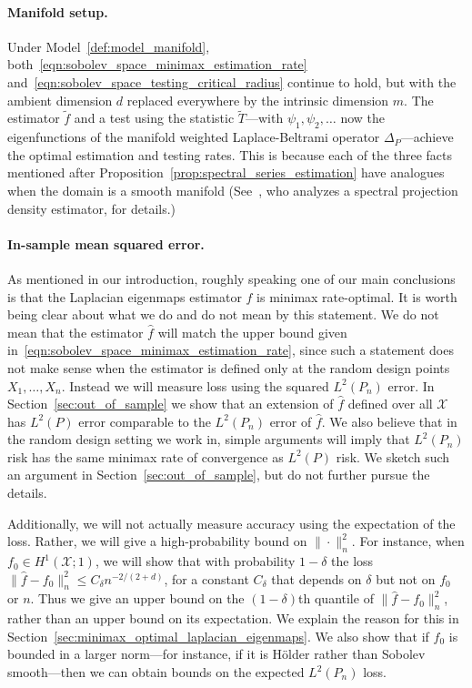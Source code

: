 \documentclass{article}
\newcommand{\1}{\mathbf{1}}
\newcommand{\mc}[1]{\mathcal{#1}}
\newcommand{\wt}[1]{\widetilde{#1}}
\newcommand{\wh}[1]{\widehat{#1}}
\theoremstyle{alden}
\theoremstyle{aldenthm}
\theoremstyle{definition}
\theoremstyle{remark}
\begin{document}
\paragraph{Manifold setup.}
Under Model~\ref{def:model_manifold}, both~\eqref{eqn:sobolev_space_minimax_estimation_rate} and~\eqref{eqn:sobolev_space_testing_critical_radius} continue to hold, but with the ambient dimension $d$ replaced everywhere by the intrinsic dimension $m$. The estimator $\wt{f}$ and a test using the statistic $\wt{T}$---with $\psi_1,\psi_2,\ldots$ now the eigenfunctions of the manifold weighted Laplace-Beltrami operator $\Delta_P$---achieve the optimal estimation and testing rates. This is because each of the three facts mentioned after Proposition~\ref{prop:spectral_series_estimation} have analogues when the domain is a smooth manifold (See~\citet{hendriks1990}, who analyzes a spectral projection density estimator, for details.)

\paragraph{In-sample mean squared error.}
As mentioned in our introduction, roughly speaking one of our main conclusions is that the Laplacian eigenmaps estimator $\wh{f}$ is minimax rate-optimal. It is worth being clear about what we do and do not mean by this statement. We do not mean that the estimator $\wh{f}$ will match the upper bound given in~\eqref{eqn:sobolev_space_minimax_estimation_rate}, since such a statement does not make sense when the estimator is defined only at the random design points $X_1,\ldots,X_n$. Instead we will measure loss using the squared $L^2(P_n)$ error. In Section~\ref{sec:out_of_sample} we show that an extension of $\wh{f}$ defined over all $\mc{X}$ has $L^2(P)$ error comparable to the $L^2(P_n)$ error of $\wh{f}$. We also believe that in the random design setting we work in, simple arguments will imply that $L^2(P_n)$ risk has the same minimax rate of convergence as $L^2(P)$ risk. We sketch such an argument in Section~\ref{sec:out_of_sample}, but do not further pursue the details. 

Additionally, we will not actually measure accuracy using the expectation of the loss. Rather, we will give a high-probability bound on $\|\cdot\|_n^2$. For instance, when $f_0 \in H^1(\mc{X};1)$, we will show that with probability $1 - \delta$ the loss $\|\wh{f} - f_0\|_n^2 \leq C_{\delta} n^{-2/(2 + d)}$, for a constant $C_{\delta}$ that depends on $\delta$ but not on $f_0$ or $n$. Thus we give an upper bound on the $(1 - \delta)$th quantile of $\|\wh{f} - f_0\|_n^2$, rather than an upper bound on its expectation. We explain the reason for this in Section~\ref{sec:minimax_optimal_laplacian_eigenmaps}. We also show that if $f_0$ is bounded in a larger norm---for instance, if it is H\"{o}lder rather than Sobolev smooth---then we can obtain bounds on the expected $L^2(P_n)$ loss.
\end{document}
